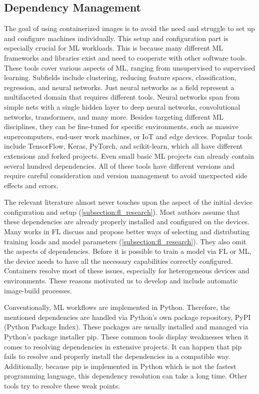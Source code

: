 \subsection{Dependency Management}

The goal of using containerized images is to avoid the need and struggle to set up and configure machines individually.
This setup and configuration part is especially crucial for ML workloads.
This is because many different ML frameworks and libraries exist and need to cooperate with other software tools.
These tools cover various aspects of ML, ranging from unsupervised to supervised learning.
Subfields include clustering, reducing feature spaces, classification, regression, and neural networks.
Just neural networks as a field represent a multifaceted domain that requires different tools.
Neural networks span from simple nets with a single hidden layer to deep neural networks, convolutional networks, transformers, and many more.
Besides targeting different ML disciplines, they can be fine-tuned for specific environments, such as massive supercomputers, end-user work machines, or IoT and edge devices.
Popular tools include TensorFlow, Keras, PyTorch, and scikit-learn, which all have different extensions and forked projects.
Even small basic ML projects can already contain several hundred dependencies.
All of these tools have different versions and require careful consideration and version management to avoid unexpected side effects and errors.

The relevant literature almost never touches upon the aspect of the initial device configuration and setup (\ref{subsection:fl_research}).
Most authors assume that these dependencies are already properly installed and configured on the devices.
Many works in FL discuss and propose better ways of selecting and distributing training loads and model parameters (\ref{subsection:fl_research}).
They also omit the aspects of dependencies.
Before it is possible to train a model via FL or ML, the device needs to have all the necessary capabilities correctly configured.
Containers resolve most of these issues, especially for heterogeneous devices and environments.
These reasons motivated us to develop and include automatic image-build processes.

Conventionally, ML workflows are implemented in Python.
Therefore, the mentioned dependencies are handled via Python's own package repository, PyPI (Python Package Index).
These packages are usually installed and managed via Python's package installer pip.
These common tools display weaknesses when it comes to resolving dependencies in extensive projects.
It can happen that pip fails to resolve and properly install the dependencies in a compatible way.
Additionally, because pip is implemented in Python which is not the fastest programming language, this dependency resolution can take a long time.
Other tools try to resolve these weak points.

